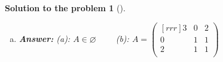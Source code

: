 \documentclass[12pt,a4]{article}
\newtheorem{solution}{Solution to the problem}
\DeclareMathOperator{\sgn}{sgn}
\newcommand{\bv}{{\mathbf v}}
\newcommand{\answer}[1]{\textbf{Answer:} #1}
\begin{document}
{\begin{solution}[]
\begin{enumerate}[(a)]
\[=
\frac{\sgn a}{\sqrt{6}}
\begin{pmatrix} 2 \\ -1 \\ 1 \end{pmatrix}
\]
We're not interested in the orientations of vectors, so let $\hat \bv_3 = \frac1{\sqrt{6}} \begin{pmatrix} 2 & -1 & 1 \end{pmatrix}^\top$
\[
P = 
\begin{pmatrix}
\hat \bv_1 & \hat \bv_2 & \hat \bv_3
\end{pmatrix}
=
\frac1{\sqrt6}
\begin{pmatrix}[rrr]
0 & \sqrt2 & 2 \\
 \sqrt3 & \sqrt2 & -1 \\
-\sqrt3 & \sqrt2 & 1 \\
\end{pmatrix}
\]
\[
PDP^{-1} = PDP^\top
=
\frac16
\begin{pmatrix}[rrr]
0 & \sqrt2 & 2 \\
 \sqrt3 & \sqrt2 & - 1 \\
-\sqrt3 & \sqrt2 & 1 \\
\end{pmatrix}
\begin{pmatrix}[rrr]
-1 & 0 & 0 \\
0 & 3 & 0 \\
0 & 0 & 3 \\
\end{pmatrix}
\begin{pmatrix}[rrr]
0 & \sqrt3 & -\sqrt3 \\
 \sqrt2 & \sqrt2 & \sqrt2 \\
2 & - 1 & 1 \\
\end{pmatrix}
=
\]
\[
=
\frac16
\begin{pmatrix}[rrr]
0 & 3\sqrt2 & 6 \\
-\sqrt3 & 3\sqrt2 & -3 \\
\sqrt3 & 3\sqrt2 & 3 \\
\end{pmatrix}
\begin{pmatrix}[rrr]
0 & \sqrt3 & -\sqrt3 \\
 \sqrt2 & \sqrt2 & \sqrt2 \\
2 & - 1 & 1 \\
\end{pmatrix}
=
\begin{pmatrix}[rrr]
3 & 0 & 2 \\
0 & 1 & 1 \\
2 & 1 & 1 \\
\end{pmatrix}
\]
\answer{ $a \neq 0$, $b=0$ }
\item
\answer{
(a): $A \in \varnothing \qquad$
(b): $A = 
\begin{pmatrix}[rrr]
3 & 0 & 2 \\
0 & 1 & 1 \\
2 & 1 & 1 \\
\end{pmatrix} }$
\end{enumerate}
\end{solution}
}
\end{document}
